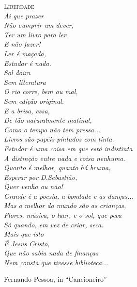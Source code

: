 {\noindent\LARGE\textsc{Liberdade}} \\

{\it
\noindent{}Ai que prazer \\
Não cumprir um dever, \\
Ter um livro para ler \\
E não fazer! \\
Ler é maçada, \\
Estudar é nada. \\
Sol doira \\
Sem literatura \\
O rio corre, bem ou mal, \\
Sem edição original. \\
E a brisa, essa, \\
De tão naturalmente matinal, \\
Como o tempo não tem pressa... \\

\noindent{}Livros são papéis pintados com tinta. \\
Estudar é uma coisa em que está indistinta \\
A distinção entre nada e coisa nenhuma. \\

\noindent{}Quanto é melhor, quanto há bruma, \\
Esperar por D.Sebastião, \\
Quer venha ou não! \\

\noindent{}Grande é a poesia, a bondade e as danças... \\
Mas o melhor do mundo são as crianças, \\

\noindent{}Flores, música, o luar, e o sol, que peca \\
Só quando, em vez de criar, seca. \\

\noindent{}Mais que isto \\
É Jesus Cristo, \\
Que não sabia nada de finanças \\
Nem consta que tivesse biblioteca... \\
}

\noindent{}Fernando Pessoa, in ``Cancioneiro''

\thispagestyle{empty}
\cleardoublepage

